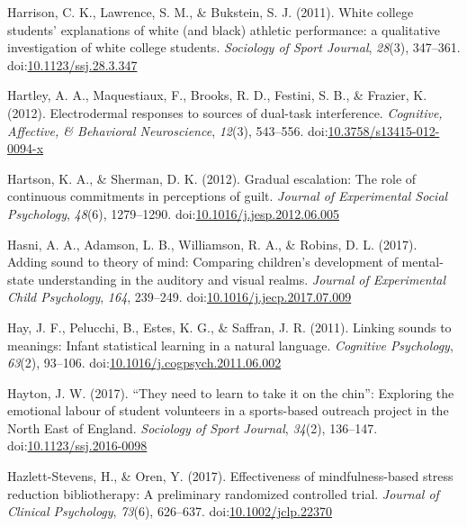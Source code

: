 \documentclass[english,man]{apa6}
\theoremstyle{definition}
\theoremstyle{definition}
\theoremstyle{definition}
\theoremstyle{remark}
\begin{document}
\hypertarget{ref-Harrison2011}{}
Harrison, C. K., Lawrence, S. M., \& Bukstein, S. J. (2011). White
college students' explanations of white (and black) athletic
performance: a qualitative investigation of white college students.
\emph{Sociology of Sport Journal}, \emph{28}(3), 347--361.
doi:\href{https://doi.org/10.1123/ssj.28.3.347}{10.1123/ssj.28.3.347}

\hypertarget{ref-Hartley2012}{}
Hartley, A. A., Maquestiaux, F., Brooks, R. D., Festini, S. B., \&
Frazier, K. (2012). Electrodermal responses to sources of dual-task
interference. \emph{Cognitive, Affective, \& Behavioral Neuroscience},
\emph{12}(3), 543--556.
doi:\href{https://doi.org/10.3758/s13415-012-0094-x}{10.3758/s13415-012-0094-x}

\hypertarget{ref-Hartson2012}{}
Hartson, K. A., \& Sherman, D. K. (2012). Gradual escalation: The role
of continuous commitments in perceptions of guilt. \emph{Journal of
Experimental Social Psychology}, \emph{48}(6), 1279--1290.
doi:\href{https://doi.org/10.1016/j.jesp.2012.06.005}{10.1016/j.jesp.2012.06.005}

\hypertarget{ref-Hasni2017}{}
Hasni, A. A., Adamson, L. B., Williamson, R. A., \& Robins, D. L.
(2017). Adding sound to theory of mind: Comparing children's development
of mental-state understanding in the auditory and visual realms.
\emph{Journal of Experimental Child Psychology}, \emph{164}, 239--249.
doi:\href{https://doi.org/10.1016/j.jecp.2017.07.009}{10.1016/j.jecp.2017.07.009}

\hypertarget{ref-Hay2011}{}
Hay, J. F., Pelucchi, B., Estes, K. G., \& Saffran, J. R. (2011).
Linking sounds to meanings: Infant statistical learning in a natural
language. \emph{Cognitive Psychology}, \emph{63}(2), 93--106.
doi:\href{https://doi.org/10.1016/j.cogpsych.2011.06.002}{10.1016/j.cogpsych.2011.06.002}

\hypertarget{ref-Hayton2017}{}
Hayton, J. W. (2017). ``They need to learn to take it on the chin'':
Exploring the emotional labour of student volunteers in a sports-based
outreach project in the North East of England. \emph{Sociology of Sport
Journal}, \emph{34}(2), 136--147.
doi:\href{https://doi.org/10.1123/ssj.2016-0098}{10.1123/ssj.2016-0098}

\hypertarget{ref-Hazlett-Stevens2017}{}
Hazlett-Stevens, H., \& Oren, Y. (2017). Effectiveness of
mindfulness-based stress reduction bibliotherapy: A preliminary
randomized controlled trial. \emph{Journal of Clinical Psychology},
\emph{73}(6), 626--637.
doi:\href{https://doi.org/10.1002/jclp.22370}{10.1002/jclp.22370}
\end{document}

